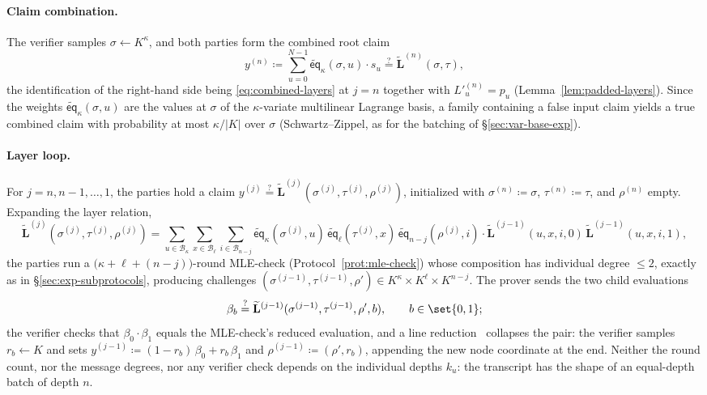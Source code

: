 \documentclass{article}
\theoremstyle{definition}
\newcommand*{\mle}{\widetilde}
\newcommand{\eq}{\mathsf{eq}}
\newcommand{\BB}{\mathcal{B}}
\begin{document}
\paragraph{Claim combination.}
The verifier samples $\sigma \gets K^\kappa$, and both parties form the combined root claim
\[
  y^{(n)} \coloneqq \sum_{u = 0}^{N - 1} \mle{\eq}_\kappa(\sigma, u) \cdot s_u \stackrel{?}{=} \mle{\mathbf{L}}^{(n)}(\sigma, \tau),
\]
the identification of the right-hand side being \eqref{eq:combined-layers} at $j = n$ together with $L'^{(n)}_u = p_u$ (Lemma~\ref{lem:padded-layers}). Since the weights $\mle{\eq}_\kappa(\sigma, u)$ are the values at $\sigma$ of the $\kappa$-variate multilinear Lagrange basis, a family containing a false input claim yields a true combined claim with probability at most $\kappa / |K|$ over $\sigma$ (Schwartz--Zippel, as for the batching of \S\ref{sec:var-base-exp}).

\paragraph{Layer loop.}
For $j = n, n - 1, \ldots, 1$, the parties hold a claim $y^{(j)} \stackrel{?}{=} \mle{\mathbf{L}}^{(j)}(\sigma^{(j)}, \tau^{(j)}, \rho^{(j)})$, initialized with $\sigma^{(n)} \coloneqq \sigma$, $\tau^{(n)} \coloneqq \tau$, and $\rho^{(n)}$ empty. Expanding the layer relation,
\[
  \mle{\mathbf{L}}^{(j)}(\sigma^{(j)}, \tau^{(j)}, \rho^{(j)}) = \sum_{u \in \BB_\kappa} \sum_{x \in \BB_\ell} \sum_{i \in \BB_{n - j}} \mle{\eq}_\kappa(\sigma^{(j)}, u) \, \mle{\eq}_\ell(\tau^{(j)}, x) \, \mle{\eq}_{n - j}(\rho^{(j)}, i) \cdot \mle{\mathbf{L}}^{(j - 1)}(u, x, i, 0) \, \mle{\mathbf{L}}^{(j - 1)}(u, x, i, 1),
\]
the parties run a $\bigl( \kappa + \ell + (n - j) \bigr)$-round MLE-check (Protocol~\ref{prot:mle-check}) whose composition has individual degree $\leq 2$, exactly as in \S\ref{sec:exp-subprotocols}, producing challenges $(\sigma^{(j - 1)}, \tau^{(j - 1)}, \rho') \in K^\kappa \times K^\ell \times K^{n - j}$. The prover sends the two child evaluations
\[
  \beta_b \stackrel{?}{=} \mle{\mathbf{L}}^{(j - 1)}(\sigma^{(j - 1)}, \tau^{(j - 1)}, \rho', b), \qquad b \in \set{0, 1};
\]
the verifier checks that $\beta_0 \cdot \beta_1$ equals the MLE-check's reduced evaluation, and a line reduction~\cite{Goldwasser:2015aa} collapses the pair: the verifier samples $r_b \gets K$ and sets $y^{(j - 1)} \coloneqq (1 - r_b)\, \beta_0 + r_b\, \beta_1$ and $\rho^{(j - 1)} \coloneqq (\rho', r_b)$, appending the new node coordinate at the end. Neither the round count, nor the message degrees, nor any verifier check depends on the individual depths $k_u$: the transcript has the shape of an equal-depth batch of depth $n$.
\end{document}
